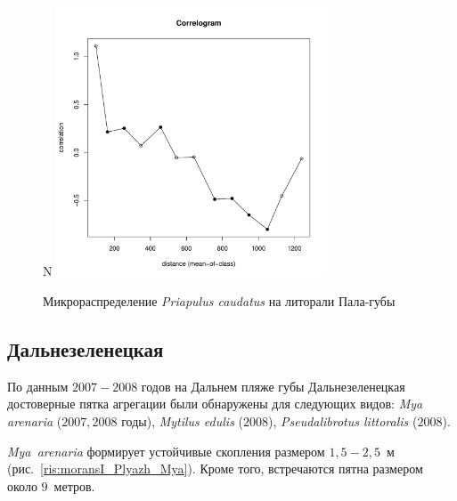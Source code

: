 	\begin{figure}[h]
	\begin{minipage}[b]{.5\linewidth}
	\begin{center}
	{\small N}
		\includegraphics[width=80mm]{../Barenc_Sea/distribution_Moran/Pala_moran_N_Priapulus_caudatus_.pdf}
	\end{center}
	\end{minipage}

	\caption{Микрораспределение {\it Priapulus caudatus} на литорали Пала-губы}
	\label{ris:moransI_Pala_Priapulus}
	\end{figure}



	\subsection{Дальнезеленецкая}
По данным $2007 - 2008$ годов на Дальнем пляже губы Дальнезеленецкая достоверные пятка агрегации были обнаружены для следующих видов: {\it Mya arenaria} ($2007, 2008$ годы), {\it Mytilus edulis} ($2008$), {\it Pseudalibrotus littoralis} ($2008$).

{\it Mya~arenaria} формирует устойчивые скопления размером $1,5 - 2,5$~м (рис.~\ref{ris:moransI_Plyazh_Mya}). 
Кроме того, встречаются пятна размером около $9$~метров.

